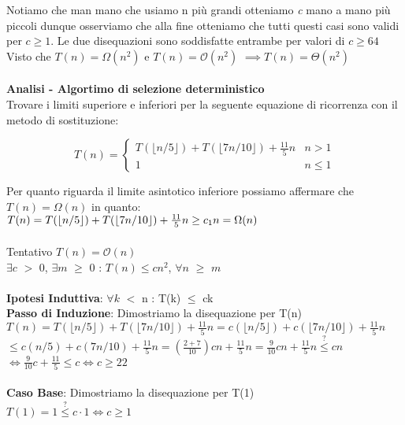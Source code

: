 \documentclass[../cheatSheetAlgoritmi.tex]{subfiles}
\begin{document}
Notiamo che man mano che usiamo n più grandi otteniamo \textit{c} mano a mano più piccoli dunque osserviamo che alla fine otteniamo che tutti questi casi sono validi per $c \geq 1$.
Le due disequazioni sono soddisfatte entrambe per valori di $c \geq 64$\\
Visto che $T(n) = \Omega(n^{2})$ e $T(n) = \mathcal{O}(n^{2})$ $\implies T(n) = \Theta(n^{2})$\\\\
\textbf{Analisi - Algortimo di selezione deterministico}\\
Trovare i limiti superiore e inferiori per la seguente equazione di ricorrenza con il metodo di sostituzione:
\begin{center}
	\begin{equation*}
  		T(n)=\begin{cases}
			T(\lfloor n/5 \rfloor) + T(\lfloor 7n/10 \rfloor) + \frac{11}{5}n & \text{$n > 1$}\\
			1 & \text{$n \leq 1$}	
 		 \end{cases}
	\end{equation*}
\end{center}
Per quanto riguarda il limite asintotico inferiore possiamo affermare che $T(n) = \Omega(n)$ in quanto:\\
$T(n) = T(\lfloor n/5 \rfloor) + T(\lfloor 7n/10 \rfloor) + \frac{11}{5}n \geq c\textsubscript{1}n = \Omega(n)$\\\\
Tentativo $T(n) = \mathcal{O}(n)$\\
$\exists c$ $>$ 0, $\exists m$ $\geq$ 0 : $T(n) \leq cn^{2}$, $\forall n$ $\geq$ $m$\\\\
\textbf{Ipotesi Induttiva}: $\forall k$ $<$ n : T(k) $\leq$ ck\\
\textbf{Passo di Induzione}: Dimostriamo la disequazione per T(n)\\
$T(n) = T(\lfloor n/5 \rfloor) + T(\lfloor 7n/10 \rfloor) + \frac{11}{5}n = c(\lfloor n/5 \rfloor) + c(\lfloor 7n/10 \rfloor) + \frac{11}{5}n$\\
$\leq c(n/5) + c(7n/10) + \frac{11}{5}n = (\frac{2 + 7}{10})cn + \frac{11}{5}n = \frac{9}{10}cn + \frac{11}{5}n \stackrel{?}{\leq} cn$\\
$\iff \frac{9}{10}c + \frac{11}{5} \leq c \iff c \geq 22$\\\\
\textbf{Caso Base}: Dimostriamo la disequazione per T(1)\\
$T(1) = 1 \stackrel{?}{\leq} c \cdot 1 \iff c \geq 1$\\\\
\end{document}

